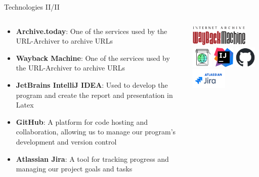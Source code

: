 \documentclass[
    ngerman,%
    authorontitle=true,
]{bfhbeamer}
\begin{document}
    \begin{frame}{Technologies II/II}
        \begin{columns}
            \begin{column}{0.7\textwidth}
                \begin{itemize}
                    \item \textbf{Archive.today}: One of the services used by the URL-Archiver to archive URLs
                    \item \textbf{Wayback Machine}: One of the services used by the URL-Archiver to archive URLs
                    \item \textbf{JetBrains IntelliJ IDEA}: Used to develop the program and create the report and presentation in Latex
                    \item \textbf{GitHub}: A platform for code hosting and collaboration, allowing us to manage our program's development and version control
                    \item \textbf{Atlassian Jira}: A tool for tracking progress and managing our project goals and tasks
                \end{itemize}
            \end{column}
            \begin{column}{0.3\textwidth}
                \includegraphics[height=1cm]{pictures/Wayback_Machine_logo}
                \vspace{1em}
                \includegraphics[height=1cm]{pictures/archive_today_logo}
                \vspace{1em}
                \includegraphics[height=1cm]{pictures/IntelliJ_IDEA_Icon}
                \vspace{1em}
                \includegraphics[height=1cm]{pictures/github-mark}
                \vspace{1em}
                \includegraphics[height=1cm]{pictures/jira_logo}
            \end{column}
        \end{columns}
    \end{frame}
\end{document}
